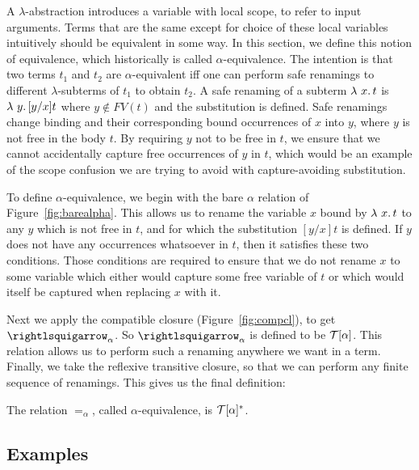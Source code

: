 A $\lambda$-abstraction introduces a
variable with local scope, to refer to input arguments.  Terms that
are the same except for choice of these local variables intuitively
should be equivalent in some way.  In this section, we define this
notion of equivalence, which historically is called
$\alpha$-equivalence.  The intention is
that two terms $t_1$ and $t_2$ are $\alpha$-equivalent iff one can
perform safe renamings to different $\lambda$-subterms of $t_1$ to
obtain $t_2$.  A safe renaming of a subterm $\lambda\ x.\, t$ is
$\lambda\ y.\, [y/x]t$ where $y\not\in\textit{FV}(t)$ and the substitution
is defined.  Safe renamings
change binding and their corresponding bound occurrences of $x$ into
$y$, where $y$ is not free in the body $t$.  By requiring $y$ not to
be free in $t$, we ensure that we cannot accidentally capture free
occurrences of $y$ in $t$, which would be an example of the scope
confusion we are trying to avoid with capture-avoiding substitution.

To define $\alpha$-equivalence, we begin with the bare $\alpha$
relation of Figure~\ref{fig:barealpha}.  This allows us to rename the
variable $x$ bound by $\lambda\ x.\, t$ to any $y$ which is not free in
$t$, and for which the substitution $[y/x] t$ is defined.  If $y$ does
not have any occurrences whatsoever in $t$, then it satisfies these
two conditions.  Those conditions are required to ensure that we do
not rename $x$ to some variable which either would capture some free
variable of $t$ or which would itself be captured when replacing $x$
with it.

Next we apply the compatible closure (Figure~\ref{fig:compcl}), to get
$\curva_\alpha$.  So $\curva_\alpha$ is defined to be $\mathcal{T}[\alpha]$.
This relation allows us to perform such a renaming anywhere we want in
a term.  Finally, we take the reflexive transitive closure, so that we
can perform any finite sequence of renamings.  This gives us the final
definition:

\begin{definition}
\label{def:alpha}
  The relation $=_\alpha$, called $\alpha$-equivalence, is $\mathcal{T}[\alpha]^*$.
  \end{definition}

\subsection{Examples}

